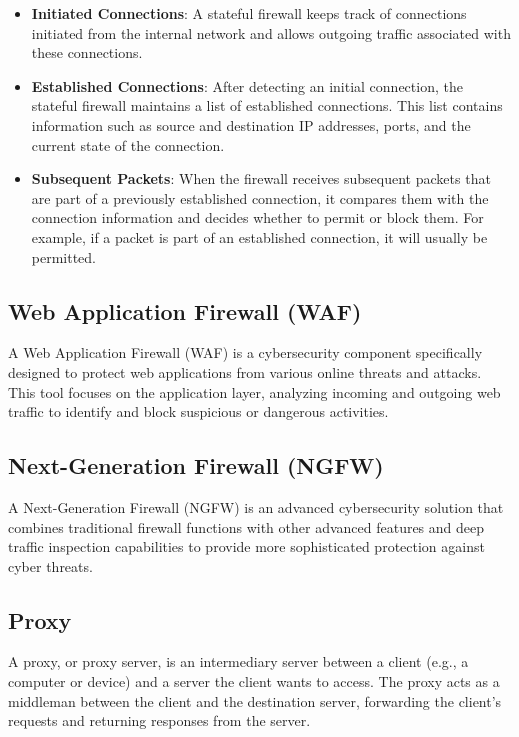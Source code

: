 \begin{itemize}
    \item \textbf{Initiated Connections}: A stateful firewall keeps track of connections initiated from the internal network and allows outgoing traffic associated with these connections.
    \item \textbf{Established Connections}: After detecting an initial connection, the stateful firewall maintains a list of established connections. This list contains information such as source and destination IP addresses, ports, and the current state of the connection.
    \item \textbf{Subsequent Packets}: When the firewall receives subsequent packets that are part of a previously established connection, it compares them with the connection information and decides whether to permit or block them. For example, if a packet is part of an established connection, it will usually be permitted.
\end{itemize}


\subsection{Web Application Firewall (WAF)}
A Web Application Firewall (WAF) is a cybersecurity component specifically designed to protect web applications from various online threats and attacks. This tool focuses on the application layer, analyzing incoming and outgoing web traffic to identify and block suspicious or dangerous activities.

\subsection{Next-Generation Firewall (NGFW)}

A Next-Generation Firewall (NGFW) is an advanced cybersecurity solution that combines traditional firewall functions with other advanced features and deep traffic inspection capabilities to provide more sophisticated protection against cyber threats.

\subsection{Proxy}

A proxy, or proxy server, is an intermediary server between a client (e.g., a computer or device) and a server the client wants to access. The proxy acts as a middleman between the client and the destination server, forwarding the client's requests and returning responses from the server.

